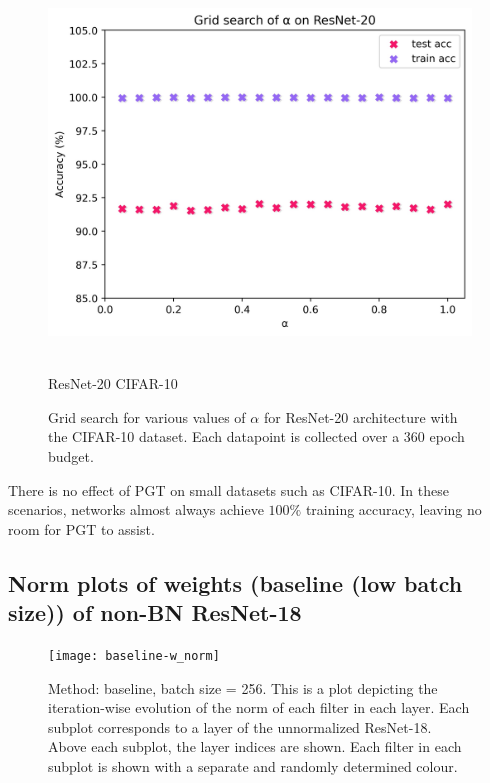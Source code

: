 \documentclass[times,sort&compress]{elsarticle}
\begin{document}
\begin{figure}[ht]
\centering
\includegraphics[width=0.5\columnwidth]{cifar10_grid_search}
\caption{\\ResNet-20 CIFAR-10}
\caption{ Grid search for various values of $\alpha$ for ResNet-20 architecture with the
CIFAR-10 dataset. Each datapoint is collected over a 360 epoch budget. }
\label{fig:grid_searchc}
\end{figure}


There is no effect of PGT on small datasets such as CIFAR-10. In these scenarios,
networks almost always achieve $100\%$ training accuracy, leaving no room for PGT to
assist.



\clearpage



\subsection{Norm plots of weights (baseline (low batch size)) of non-BN ResNet-18}
\begin{figure}[ht] \centering \texttt{[image: baseline-w\_norm]}
\caption{ Method: baseline, batch size = 256. This is a plot depicting the
iteration-wise evolution of the norm of each filter in each layer. Each subplot
corresponds to a layer of the unnormalized ResNet-18. Above each subplot, the layer
indices are shown. Each filter in each subplot is shown with a separate and randomly
determined colour. } \end{figure}

\clearpage
\end{document}

